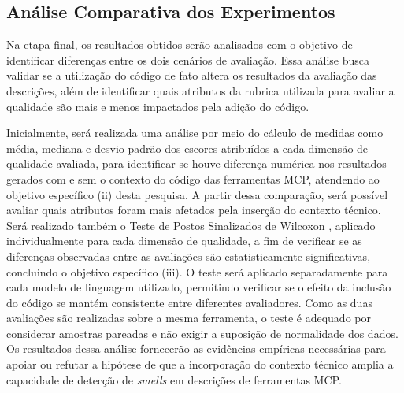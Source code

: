 \subsection{Análise Comparativa dos Experimentos}

Na etapa final, os resultados obtidos serão analisados com o objetivo de identificar diferenças entre os dois cenários de avaliação. Essa análise busca validar se a utilização do código de fato altera os resultados da avaliação das descrições, além de identificar quais atributos da rubrica utilizada para avaliar a qualidade são mais e menos impactados pela adição do código.

Inicialmente, será realizada uma análise por meio do cálculo de medidas como média, mediana e desvio-padrão dos escores atribuídos a cada dimensão de qualidade avaliada, para identificar se houve diferença numérica nos resultados gerados com e sem o contexto do código das ferramentas MCP, atendendo ao objetivo específico (ii) desta pesquisa. A partir dessa comparação, será possível avaliar quais atributos foram mais afetados pela inserção do contexto técnico. Será realizado também o Teste de Postos Sinalizados de Wilcoxon \cite{wilcoxon1945individual}, aplicado individualmente para cada dimensão de qualidade, a fim de verificar se as diferenças observadas entre as avaliações são estatisticamente significativas, concluindo o objetivo específico (iii). O teste será aplicado separadamente para cada modelo de linguagem utilizado, permitindo verificar se o efeito da inclusão do código se mantém consistente entre diferentes avaliadores. Como as duas avaliações são realizadas sobre a mesma ferramenta, o teste é adequado por considerar amostras pareadas e não exigir a suposição de normalidade dos dados. Os resultados dessa análise fornecerão as evidências empíricas necessárias para apoiar ou refutar a hipótese de que a incorporação do contexto técnico amplia a capacidade de detecção de \textit{smells} em descrições de ferramentas MCP.
